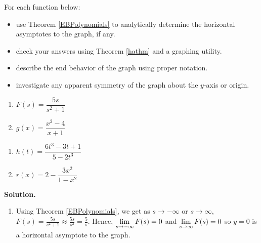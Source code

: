 \begin{ex} \label{haexample} For each function below:

\begin{itemize}

\item use Theorem \ref{EBPolynomials} to  analytically determine the horizontal asymptotes to the graph, if any.

\item check your answers using Theorem \ref{hathm} and a graphing utility.   

\item describe the end behavior of the graph using proper notation.

\item  investigate any apparent symmetry of the graph about the $y$-axis or origin.

\end{itemize}

\begin{multicols}{2}
\begin{enumerate}

\item $F(s) = \dfrac{5s}{s^2+1}$  

\item  $g(x) = \dfrac{x^2-4}{x+1}$ 

\setcounter{HW}{\value{enumi}}
\end{enumerate}
\end{multicols}

\begin{multicols}{2}
\begin{enumerate}
\setcounter{enumi}{\value{HW}}


\item  $h(t) = \dfrac{6t^3-3t+1}{5-2t^3}$

\item  $r(x) = 2 - \dfrac{3x^2}{1-x^2}$ 

\setcounter{HW}{\value{enumi}}
\end{enumerate}
\end{multicols}


{ \bf Solution.}

\begin{enumerate}

\item  Using  Theorem \ref{EBPolynomials}, we get as $s \rightarrow  -\infty$ or $s \rightarrow \infty$, $F(s) = \frac{5s}{s^2+1}  \approx \frac{5s}{s^2} = \frac{5}{s}$.  Hence, $\ds{\lim_{s \rightarrow  -\infty} F(s) = 0}$ and $\ds{\lim_{s \rightarrow  \infty} F(s) = 0}$   so $y = 0$ is a horizontal asymptote to the graph.  


\end{enumerate}
\end{ex}
